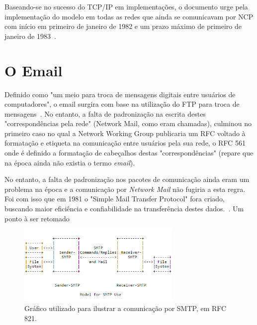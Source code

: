 \documentclass[conference]{IEEEtran}
\begin{document}
  Baseando-se no sucesso do TCP/IP em implementações, o documento urge pela implementação do modelo em todas as redes que ainda se comunicavam por NCP com início em primeiro de janeiro de 1982 e um prazo máximo de primeiro de janeiro  de 1983~\cite{rfc801}.
  

\section{O Email}

	Definido como "um meio para troca de mensagens digitais entre usuários de computadores", o email surgira com base na utilização do FTP para troca de mensagens~\cite{rfc561}. No entanto, a falta de padronização na escrita destes "correspondências pela rede" (Network Mail, como eram chamadas), culminou no primeiro caso no qual a Network Working Group publicaria um RFC voltado à formatação e etiqueta na comunicação entre usuários pela sua rede, o RFC 561 onde é definido a formatação de cabeçalhos destas "correspondências" (repare que na época ainda não existia o termo \emph{email}).~\cite{rfc561}
	
	No entanto, a falta de padronização nos pacotes de comunicação ainda eram um problema na época e a comunicação por \emph{Network Mail} não fugiria a esta regra. Foi com isso que em 1981 o "Simple Mail Transfer Protocol" fora criado, buscando maior eficiência e confiabilidade na transferência destes dados.~\cite{rfc788}. Um ponto à ser retomado 
	
\begin{figure}[h]
	\centering
	\includegraphics[width=3.1in]{smtp}
	\caption{Gráfico utilizado para ilustrar a comunicação por SMTP,
	em RFC 821.~\cite{rfc821}}
	\label{smtp_fig}
\end{figure}
\end{document}
